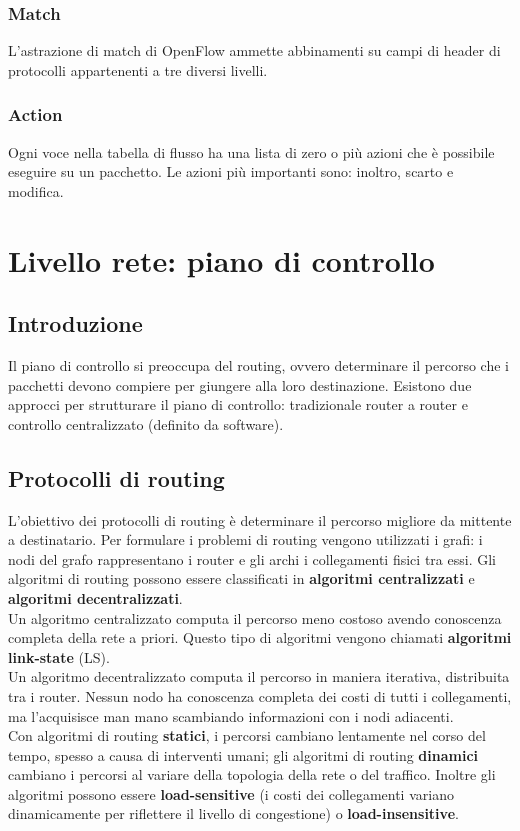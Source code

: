 \documentclass[11pt]{article}
\begin{document}
\subsubsection{Match}
L'astrazione di match di OpenFlow ammette abbinamenti su campi di header di protocolli appartenenti a tre diversi livelli.
\subsubsection{Action}
Ogni voce nella tabella di flusso ha una lista di zero o più azioni che è possibile eseguire su un pacchetto. Le azioni 
più importanti sono: inoltro, scarto e modifica.
\section{Livello rete: piano di controllo}
\subsection{Introduzione}
Il piano di controllo si preoccupa del routing, ovvero determinare il percorso che i pacchetti devono compiere per giungere 
alla loro destinazione. Esistono due approcci per strutturare il piano di controllo: tradizionale router a router e controllo 
centralizzato (definito da software).
\subsection{Protocolli di routing}
L'obiettivo dei protocolli di routing è determinare il percorso migliore da mittente a destinatario. Per formulare i problemi 
di routing vengono utilizzati i grafi: i nodi del grafo rappresentano i router e gli archi i collegamenti fisici tra essi. 
Gli algoritmi di routing possono essere classificati in \textbf{algoritmi centralizzati} e \textbf{algoritmi decentralizzati}.\\
Un algoritmo centralizzato computa il percorso meno costoso avendo conoscenza completa della rete a priori. Questo tipo 
di algoritmi vengono chiamati \textbf{algoritmi link-state} (LS).\\
Un algoritmo decentralizzato computa il percorso in maniera iterativa, distribuita tra i router. Nessun nodo ha conoscenza 
completa dei costi di tutti i collegamenti, ma l'acquisisce man mano scambiando informazioni con i nodi adiacenti.\\
Con algoritmi di routing \textbf{statici}, i percorsi cambiano lentamente nel corso del tempo, spesso a causa di interventi 
umani; gli algoritmi di routing \textbf{dinamici} cambiano i percorsi al variare della topologia della rete o del traffico.
Inoltre gli algoritmi possono essere \textbf{load-sensitive} (i costi dei collegamenti variano dinamicamente per riflettere 
il livello di congestione) o \textbf{load-insensitive}.
\end{document}
